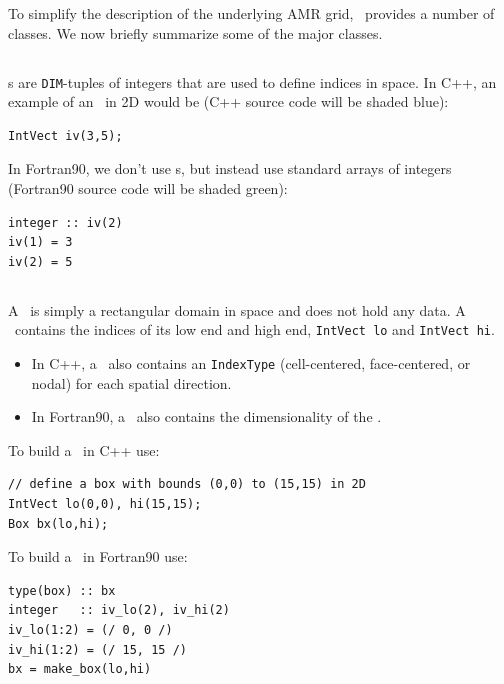 To simplify the description of the underlying AMR grid, \BoxLib\
provides a number of classes.  We now briefly summarize some of the major
classes.

\subsection{\IntVect}

\IntVect s are {\tt DIM}-tuples of integers that are used to define
indices in space.  In C++, an example of an \IntVect\ in 2D would be
(C++ source code will be shaded blue):
\begin{lstlisting}[backgroundcolor=\color{light-blue}]
IntVect iv(3,5);
\end{lstlisting}
In Fortran90, we don't use \IntVect s, but instead use standard
arrays of integers (Fortran90 source code will be shaded green):
\begin{lstlisting}[backgroundcolor=\color{light-green}]
integer :: iv(2)
iv(1) = 3
iv(2) = 5
\end{lstlisting}

\subsection{\BoxType}

A \BoxType\ is simply a rectangular domain in space and does not hold any data.
A \BoxType\ contains the indices of its low end and high end, 
{\tt IntVect lo} and {\tt IntVect hi}.
\begin{itemize}
\item In C++, a \BoxType\ also
contains an {\tt IndexType} (cell-centered, face-centered, or nodal) for each
spatial direction.
\item In Fortran90, a \BoxType\ also contains the dimensionality 
of the \BoxType.
\end{itemize}
To build a \BoxType\ in C++ use:
\begin{lstlisting}[backgroundcolor=\color{light-blue}]
// define a box with bounds (0,0) to (15,15) in 2D
IntVect lo(0,0), hi(15,15);
Box bx(lo,hi);
\end{lstlisting}
To build a \BoxType\ in Fortran90 use:
\begin{lstlisting}[backgroundcolor=\color{light-green}]
type(box) :: bx
integer   :: iv_lo(2), iv_hi(2)
iv_lo(1:2) = (/ 0, 0 /)
iv_hi(1:2) = (/ 15, 15 /)
bx = make_box(lo,hi)
\end{lstlisting}

